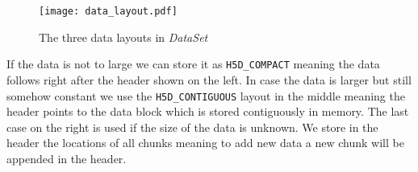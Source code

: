 \documentclass{article}
\begin{document}
\begin{figure}[ht!]
\centering
\texttt{[image: data\_layout.pdf]}
\caption{The three data layouts in \textit{DataSet}}
\label{fig:datalayout}
\end{figure}

If the data is not to large we can store it as \texttt{H5D\_COMPACT} meaning the data follows right after the header shown on the left. In case the data is larger but still somehow constant we use the \texttt{H5D\_CONTIGUOUS} layout in the middle meaning the header points to the data block which is stored contiguously in memory. The last case on the right is used if the size of the data is unknown. We store in the header the locations of all chunks meaning to add new data a new chunk will be appended in the header.

\end{document}
